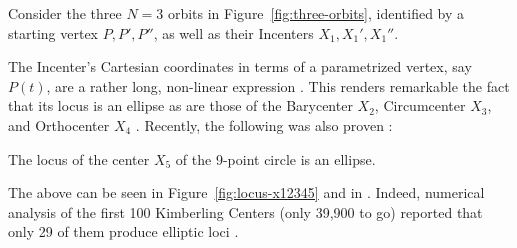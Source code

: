 Consider the three $N=3$ orbits in Figure~\ref{fig:three-orbits}, identified by a starting vertex $P,P',P''$, as well as their Incenters $X_1,X_1',X_1''$.

The Incenter's Cartesian coordinates in terms of a parametrized vertex, say $P(t)$, are a rather long, non-linear expression \cite{ronaldo19}. This renders remarkable the fact that its locus is an ellipse \cite{olga14} as are those of the Barycenter $X_2$, Circumcenter $X_3$, and Orthocenter $X_4$ \cite{corentin19,ronaldo19,sergei2016}. Recently, the following was also proven \cite{ronaldo19a}:

\begin{theorem}
The locus of the center $X_5$ of the 9-point circle is an ellipse.
\end{theorem}

The above can be seen in Figure~\ref{fig:locus-x12345} and in \cite[pl\#7]{dsr_math_intell_playlist}. Indeed, numerical analysis of the first 100 Kimberling Centers (only 39,900 to go) reported that only 29 of them produce elliptic loci \cite{reznik2020-loci}.

